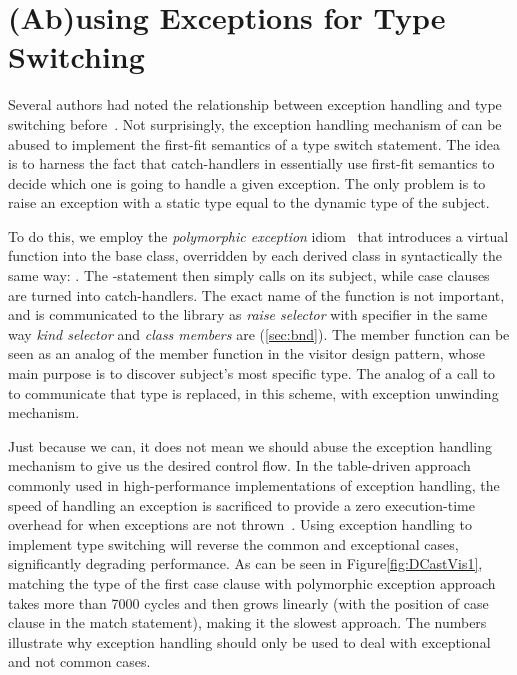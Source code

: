 \section{(Ab)using Exceptions for Type Switching}
\label{sec:xpm}

Several authors had noted the relationship between exception handling and type 
switching before~\cite{Glew99,ML2000}. Not surprisingly, the exception handling 
mechanism of \Cpp{} can be abused to implement the first-fit semantics of a type 
switch statement. The idea is to harness the fact that catch-handlers in \Cpp{} 
essentially use first-fit semantics to decide which one is going to handle a 
given exception. The only problem is to raise an exception with a static type 
equal to the dynamic type of the subject.

To do this, we employ the \emph{polymorphic exception} idiom~\cite{PolyExcept} that 
introduces a virtual function  into the 
base class, overridden by each derived class in syntactically the same way: 
. The -statement then simply calls  on its subject, 
while case clauses are turned into catch-handlers. The exact name of the 
function is not important, and is communicated to the library 
as \emph{raise selector} with  specifier in the same way 
\emph{kind selector} and \emph{class members} are (\textsection\ref{sec:bnd}). 
The  member function can be seen as an analog of 
the  member function in the visitor design pattern, whose main purpose is 
to discover subject's most specific type. The analog of a call to  
to communicate that type is replaced, in this scheme, with exception unwinding 
mechanism.

Just because we can, it does not mean we should abuse the exception handling 
mechanism to give us the desired control flow. In the table-driven approach 
commonly used in high-performance implementations of exception handling, the 
speed of handling an exception is sacrificed to provide a zero execution-time 
overhead for when exceptions are not thrown~\cite{Schilling98}. Using exception 
handling to implement type switching will reverse the common and exceptional 
cases, significantly degrading performance. As can be seen in 
Figure\ref{fig:DCastVis1}, matching the type of the first case clause with 
polymorphic exception approach takes more than 7000 cycles and then grows 
linearly (with the position of case clause in the match statement), making it the 
slowest approach. The numbers illustrate why exception handling should only be 
used to deal with exceptional and not common cases.

